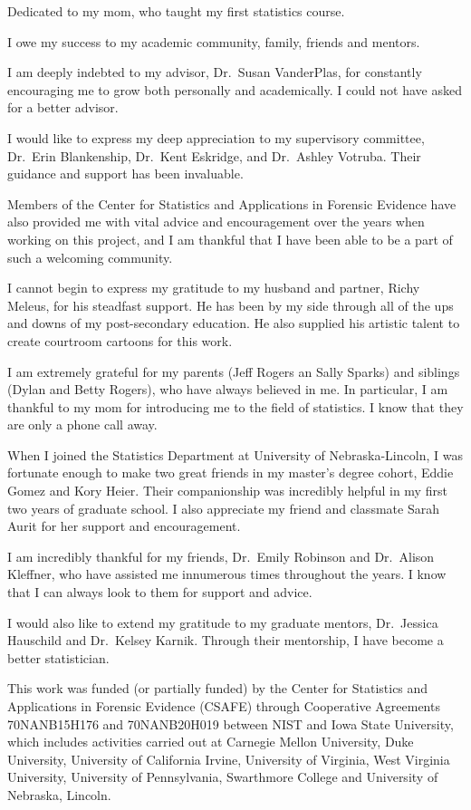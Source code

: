 \documentclass[print]{nuthesis}
\begin{document}
\begin{dedication}
\raggedright
Dedicated to my mom, who taught my first statistics course.
\end{dedication}

\begin{acknowledgments}
\raggedright
I owe my success to my academic community, family, friends and mentors.

I am deeply indebted to my advisor, Dr.~Susan VanderPlas, for constantly encouraging me to grow both personally and academically. I could not have asked for a better advisor.

I would like to express my deep appreciation to my supervisory committee, Dr.~Erin Blankenship, Dr.~Kent Eskridge, and Dr.~Ashley Votruba. Their guidance and support has been invaluable.

Members of the Center for Statistics and Applications in Forensic Evidence have also provided me with vital advice and encouragement over the years when working on this project, and I am thankful that I have been able to be a part of such a welcoming community.

I cannot begin to express my gratitude to my husband and partner, Richy Meleus, for his steadfast support. He has been by my side through all of the ups and downs of my post-secondary education. He also supplied his artistic talent to create courtroom cartoons for this work.

I am extremely grateful for my parents (Jeff Rogers an Sally Sparks) and siblings (Dylan and Betty Rogers), who have always believed in me. In particular, I am thankful to my mom for introducing me to the field of statistics. I know that they are only a phone call away.

When I joined the Statistics Department at University of Nebraska-Lincoln, I was fortunate enough to make two great friends in my master's degree cohort, Eddie Gomez and Kory Heier. Their companionship was incredibly helpful in my first two years of graduate school. I also appreciate my friend and classmate Sarah Aurit for her support and encouragement.

I am incredibly thankful for my friends, Dr.~Emily Robinson and Dr.~Alison Kleffner, who have assisted me innumerous times throughout the years. I know that I can always look to them for support and advice.

I would also like to extend my gratitude to my graduate mentors, Dr.~Jessica Hauschild and Dr.~Kelsey Karnik. Through their mentorship, I have become a better statistician.

This work was funded (or partially funded) by the Center for Statistics and Applications in Forensic Evidence (CSAFE) through Cooperative Agreements 70NANB15H176 and 70NANB20H019 between NIST and Iowa State University, which includes activities carried out at Carnegie Mellon University, Duke University, University of California Irvine, University of Virginia, West Virginia University, University of Pennsylvania, Swarthmore College and University of Nebraska, Lincoln.
\end{acknowledgments}
\end{document}

